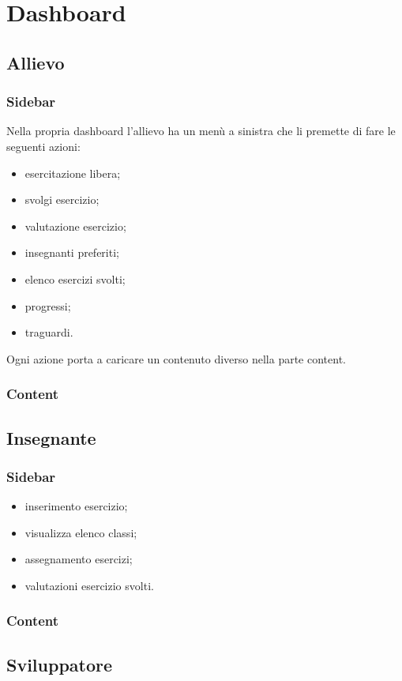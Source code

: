 \section{Dashboard}
\subsection{Allievo}
\subsubsection{Sidebar}
Nella propria dashboard l'allievo ha un menù a sinistra che li premette di fare le seguenti azioni:
\begin{itemize}
\item esercitazione libera;
\item svolgi esercizio;
\item valutazione esercizio;
\item insegnanti preferiti;
\item elenco esercizi svolti;
\item progressi;
\item traguardi.
\end{itemize}
Ogni azione porta a caricare un contenuto diverso nella parte content.
\subsubsection{Content}
\subsection{Insegnante}
\subsubsection{Sidebar}
\begin{itemize}
\item inserimento esercizio;
\item visualizza elenco classi;
\item assegnamento esercizi;
\item valutazioni esercizio svolti.
\end{itemize}

\subsubsection{Content}
\subsection{Sviluppatore}

